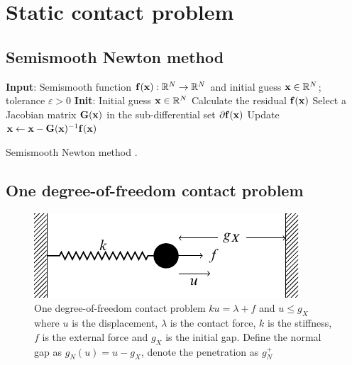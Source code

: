 \documentclass[fleqn,12pt,letter]{reportY}
\author{Yulin Shi \\ \href{http://structdynviblab.mcgill.ca/}{Structural dynamics and vibration laboratory} \\ McGill University }
\numberwithin{figure}{chapter}
\begin{document}
\maketitle
\chapter{Static contact problem}
\section{Semismooth Newton method}
\begin{algo}
\begin{algobox}
\begin{algorithmic}[1]
\STATE \textbf{Input}: Semismooth function $\mathbf{f}(\mathbf{x}): \mathbb R^N \rightarrow \mathbb R^N$ and initial guess $\mathbf{x}\in \mathbb R^N$; tolerance $\varepsilon>0$ 
\STATE \textbf{Init}: Initial guess $\mathbf{x}\in \mathbb R^N$ 
	\STATE Calculate the residual $\mathbf{f}(\mathbf{x})$
	\STATE Select a Jacobian matrix $\mathbf G(\mathbf{x})$ in the sub-differential set $\partial \mathbf{f}(\mathbf{x})$
	\STATE Update $\mathbf{x} \leftarrow \mathbf{x} - \mathbf G(\mathbf{x})^{-1} \mathbf{f}(\mathbf{x})$
\ENDWHILE
\end{algorithmic}
\end{algobox}
\caption{Semismooth Newton method \cite{hintermuller2010semismooth,fischer1992special}.}\label{al:static/semismooth}
\end{algo}
\section{One degree-of-freedom contact problem}
\begin{figure}[ht]
\centering
\includegraphics[scale=1]{figure/mass_spring_one_dof/tikz}
\caption{One degree-of-freedom contact problem $ku=\lambda +f$ and $u\leq g_X$ where $u$ is the displacement, $\lambda$ is the contact force, $k$ is the stiffness, $f$ is the external force and $g_X$ is the initial gap. Define the normal gap as $g_N(u)=u-g_X$, denote the penetration as $g_N^+$}
\label{mass_spring_one_dof}
\end{figure}
\end{document}
